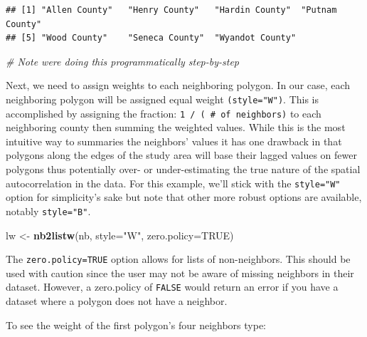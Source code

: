 \documentclass[
]{article}
\newenvironment{Shaded}{\begin{snugshade}}{\end{snugshade}}
\newcommand{\AttributeTok}[1]{\textcolor[rgb]{0.13,0.29,0.53}{#1}}
\newcommand{\CommentTok}[1]{\textcolor[rgb]{0.56,0.35,0.01}{\textit{#1}}}
\newcommand{\ConstantTok}[1]{\textcolor[rgb]{0.56,0.35,0.01}{#1}}
\newcommand{\DecValTok}[1]{\textcolor[rgb]{0.00,0.00,0.81}{#1}}
\newcommand{\FunctionTok}[1]{\textcolor[rgb]{0.13,0.29,0.53}{\textbf{#1}}}
\newcommand{\NormalTok}[1]{#1}
\newcommand{\OtherTok}[1]{\textcolor[rgb]{0.56,0.35,0.01}{#1}}
\newcommand{\SpecialCharTok}[1]{\textcolor[rgb]{0.81,0.36,0.00}{\textbf{#1}}}
\newcommand{\StringTok}[1]{\textcolor[rgb]{0.31,0.60,0.02}{#1}}
\begin{document}
\begin{verbatim}
## [1] "Allen County"   "Henry County"   "Hardin County"  "Putnam County" 
## [5] "Wood County"    "Seneca County"  "Wyandot County"
\end{verbatim}

\begin{Shaded}
\begin{Highlighting}[]
\CommentTok{\# Note we\textquotesingle{}re doing this programmatically step{-}by{-}step}
\end{Highlighting}
\end{Shaded}

Next, we need to assign weights to each neighboring polygon. In our
case, each neighboring polygon will be assigned equal weight
\texttt{(style="W")}. This is accomplished by assigning the fraction:
\texttt{1\ /\ (\ \#\ of\ neighbors)} to each neighboring county then
summing the weighted values. While this is the most intuitive way to
summaries the neighbors' values it has one drawback in that polygons
along the edges of the study area will base their lagged values on fewer
polygons thus potentially over- or under-estimating the true nature of
the spatial autocorrelation in the data. For this example, we'll stick
with the \texttt{style="W"} option for simplicity's sake but note that
other more robust options are available, notably \texttt{style="B"}.

\begin{Shaded}
\begin{Highlighting}[]
\NormalTok{lw }\OtherTok{\textless{}{-}} \FunctionTok{nb2listw}\NormalTok{(nb, }\AttributeTok{style=}\StringTok{"W"}\NormalTok{, }\AttributeTok{zero.policy=}\ConstantTok{TRUE}\NormalTok{)}
\end{Highlighting}
\end{Shaded}

The \texttt{zero.policy=TRUE} option allows for lists of non-neighbors.
This should be used with caution since the user may not be aware of
missing neighbors in their dataset. However, a zero.policy of
\texttt{FALSE} would return an error if you have a dataset where a
polygon does not have a neighbor.

To see the weight of the first polygon's four neighbors type:

\begin{Shaded}
\end{Shaded}
\end{document}
